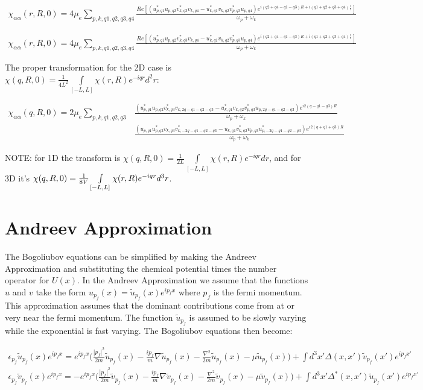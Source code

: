 \documentclass{article}
\begin{document}
\begin{align*}
\chi_{\alpha\alpha}(r,R,0)=4\mu_e\sum\limits_{p,k,q1,q2,q3,q4}\frac{Re[(u^*_{p,q1}u_{p,q2}v^*_{k,q3}v_{k,q4}-u^*_{k,q1}v_{k,q2}v^*_{p,q3}u_{p,q4})e^{i(q2+q4-q1-q3)R+i(q1+q2+q3+q4)\frac{r}{2}}]}{\omega_{p}+\omega_{k}}
\end{align*}

\begin{align*}
\chi_{\alpha\alpha}(r,R,0)=4\mu_e\sum\limits_{p,k,q1,q2,q3,q4}\frac{Re[(u^*_{p,q1}u_{p,q2}v^*_{k,q3}v_{k,q4}-u^*_{k,q1}v_{k,q2}v^*_{p,q3}u_{p,q4})e^{i(q2+q4-q1-q3)R+i(q1+q2+q3+q4)\frac{r}{2}}]}{\omega_{p}+\omega_{k}}
\end{align*}

The proper transformation for the 2D case is $\chi(q,R,0)=\frac{1}{4L^2}\int\limits_{[-L,L]}\chi(r,R)e^{-iqr}d^2r$:

\begin{align*}
\chi_{\alpha\alpha}(q,R,0)=2\mu_e\sum\limits_{p,k,q1,q2,q3}& \frac{(u^*_{p,q1}u_{p,q2}v^*_{k,q3}v_{k,2q-q1-q2-q3}-u^*_{k,q1}v_{k,q2}v^*_{p,q3}u_{p,2q-q1-q2-q3})e^{i2(q-q1-q3)R}}{\omega_{p}+\omega_{k}} \\
 & \frac{(u_{p,q1}u^*_{p,q2}v_{k,q3}v^*_{k,-2q-q1-q2-q3}-u_{k,q1}v^*_{k,q2}v_{p,q3}u^*_{p,-2q-q1-q2-q3})e^{i2(q+q1+q3)R}}{\omega_{p}+\omega_{k}}
\end{align*}

NOTE: for 1D the transform is $\chi(q,R,0)=\frac{1}{2L}\int\limits_{[-L,L]}\chi(r,R)e^{-iqr}dr$, and for 3D it's
$\\ \chi(q,R,0)=\frac{1}{8V}\int\limits_{[-L,L]}\chi(r,R)e^{-iqr}d^3r$.



\section*{Andreev Approximation}
The Bogoliubov equations can be simplified by making the Andreev Approximation and substituting the chemical potential times the number operator for $U(x)$. In the Andreev Approximation we assume that the functions $u$ and $v$ take the form $u_{p_f}(x)=\tilde{u}_{p_f}(x)e^{ip_f x}$ where $p_f$ is the fermi momentum. This approximation assumes that the dominant contributions come from at or very near the fermi momentum. The function $\tilde{u}_{p_f}$ is assumed to be slowly varying while the exponential is fast varying. The Bogoliubov equations then become:

\begin{align*}
\epsilon_{p_f}\tilde{u}_{p_f}(x)e^{ip_f x}=e^{ip_f x}\bigg(\frac{|p_f|^2}{2m}\tilde{u}_{p_f}(x)-\frac{ip_f}{m}\nabla\tilde{u}_{p_f}(x)-\frac{\nabla^2}{2m}\tilde{u}_{p_f}(x)-\mu\tilde{u}_{p_f}(x)\bigg)+\int d^3x'\Delta(x,x')\tilde{v}_{p_f}(x')e^{ip_f x'} \\
\epsilon_{p_f}\tilde{v}_{p_f}(x)e^{ip_f x}=-e^{ip_f x}\bigg(\frac{|p_f|^2}{2m}\tilde{v}_{p_f}(x)-\frac{ip_f}{m}\nabla\tilde{v}_{p_f}(x)-\frac{\nabla^2}{2m}\tilde{v}_{p_f}(x)-\mu\tilde{v}_{p_f}(x)\bigg)+\int d^3x'\Delta^*(x,x')\tilde{u}_{p_f}(x')e^{ip_f x'}
\end{align*}
\end{document}
